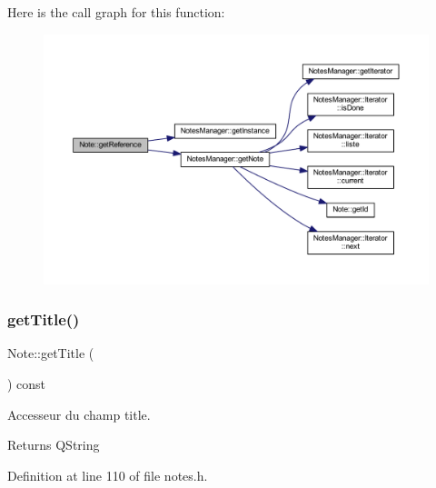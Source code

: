 Here is the call graph for this function\+:\nopagebreak
\begin{figure}[H]
\begin{center}
\leavevmode
\includegraphics[width=350pt]{class_note_a8e3ba6961f62a38f49b5fd209c083896_cgraph}
\end{center}
\end{figure}
\mbox{\label{class_note_afd40e5372b7fd231bbd31038bf0bb4d9}} 
\subsubsection{\texorpdfstring{get\+Title()}{getTitle()}}
{\footnotesize\ttfamily Note\+::get\+Title (\begin{DoxyParamCaption}{ }\end{DoxyParamCaption}) const\hspace{0.3cm}{\ttfamily [inline]}}



Accesseur du champ title. 

\begin{DoxyReturn}{Returns}
Q\+String 
\end{DoxyReturn}


Definition at line 110 of file notes.\+h.

